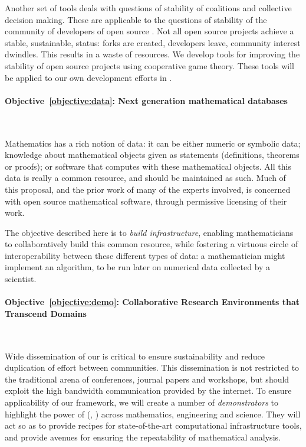 \documentclass[noworkareas,deliverables,\classoptions]{euproposal}       %
\begin{document}
\begin{proposal}
Another set of tools deals with questions of stability of coalitions
and collective decision making.  These are applicable to the questions
of stability of the community of developers of open source \VREs. Not
all open source projects achieve a stable, sustainable, status: forks
are created, developers leave, community interest dwindles. This
results in a waste of resources.  We develop tools for improving the
stability of open source projects using cooperative game theory. These
tools will be applied to our own development efforts in \TheProject
\VREs.


\paragraph{Objective~\ref{objective:data}: Next generation mathematical databases}\ 

Mathematics has a rich notion of data: it can be either
numeric or symbolic data; knowledge about mathematical objects given as
statements (definitions, theorems or proofs); or software that computes
with these mathematical objects.
%
All this data is really a common resource, and should be maintained as
such. Much of this proposal, and the prior work of many of the experts
involved, is concerned with open source mathematical software, through
permissive licensing of their work.

The objective described here is to \emph{build infrastructure},
enabling mathematicians to collaboratively build this common resource,
while fostering a virtuous circle of interoperability between these
different types of data: a mathematician might implement an
algorithm, to be run later on numerical data collected by a
scientist.

\paragraph{Objective~\ref{objective:demo}: Collaborative Research Environments that Transcend Domains}\ 

Wide dissemination of our \VREs is critical to ensure sustainability
and reduce duplication of effort between communities. This
dissemination is not restricted to the traditional arena of
conferences, journal papers and workshops, but should exploit the high
bandwidth communication provided by the internet. To ensure
applicability of our framework, we will create a number of
\emph{demonstrators} to highlight the power of \TheProject{}
(, ) across mathematics,
engineering and science. They will act so as to provide recipes for
state-of-the-art computational infrastructure tools, and provide
avenues for ensuring the repeatability of mathematical analysis.


\end{proposal}
\end{document}
